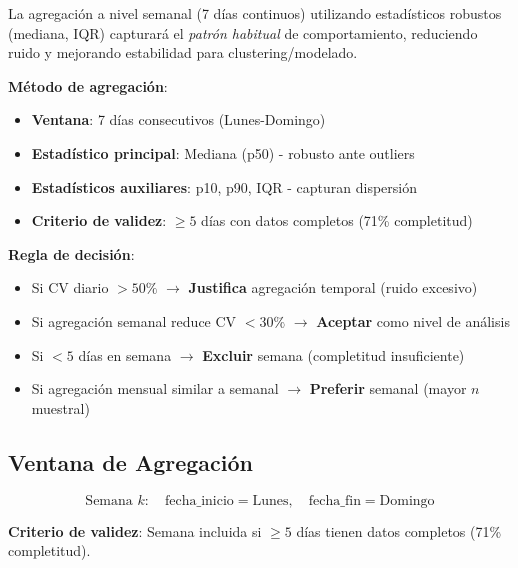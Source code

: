 \documentclass[12pt,letterpaper,twoside]{report}
\begin{document}
\begin{calculobox}
\begin{hipotesisbox}
La agregación a nivel semanal (7 días continuos) utilizando estadísticos robustos (mediana, IQR) capturará el \textit{patrón habitual} de comportamiento, reduciendo ruido y mejorando estabilidad para clustering/modelado.
\end{hipotesisbox}

\begin{estadisticobox}
\textbf{Método de agregación}:

\begin{itemize}[noitemsep]
    \item \textbf{Ventana}: 7 días consecutivos (Lunes-Domingo)
    \item \textbf{Estadístico principal}: Mediana (p50) - robusto ante outliers
    \item \textbf{Estadísticos auxiliares}: p10, p90, IQR - capturan dispersión
    \item \textbf{Criterio de validez}: $\geq 5$ días con datos completos (71\% completitud)
\end{itemize}
\end{estadisticobox}

\begin{reglabox}
\textbf{Regla de decisión}:

\begin{itemize}[noitemsep]
    \item Si CV diario $> 50\%$ $\to$ \textbf{Justifica} agregación temporal (ruido excesivo)
    \item Si agregación semanal reduce CV $< 30\%$ $\to$ \textbf{Aceptar} como nivel de análisis
    \item Si $< 5$ días en semana $\to$ \textbf{Excluir} semana (completitud insuficiente)
    \item Si agregación mensual similar a semanal $\to$ \textbf{Preferir} semanal (mayor $n$ muestral)
\end{itemize}
\end{reglabox}

\subsection{Ventana de Agregación}

\begin{equation}
\text{Semana } k: \quad \text{fecha\_inicio} = \text{Lunes}, \quad \text{fecha\_fin} = \text{Domingo}
\end{equation}

\textbf{Criterio de validez}: Semana incluida si $\geq 5$ días tienen datos completos (71\% completitud).


\end{calculobox}
\end{document}
